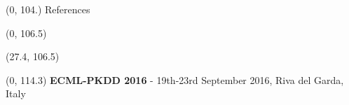 \documentclass[final]{beamer}
\begin{document}
\begin{frame}{}
  \begin{textblock}{80}(0, 104.)
    References
  \end{textblock}

  
 \begin{textblock}{52}(0, 106.5)
    \small
    \setlength\bibitemsep{8pt}
    \printbibliography[heading=none]
  \end{textblock}
  
  \begin{textblock}{25.2}(27.4, 106.5)
    \small
  \end{textblock}
  

  \begin{textblock}{80}(0, 114.3)
    \footnotesize
    \textbf{ECML-PKDD 2016}  -  19th-23rd September 2016, Riva del Garda, Italy\hfill
  \end{textblock}
  
\end{frame}
\end{document}
